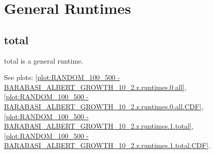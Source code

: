 %
%
\section{General Runtimes}

\subsection{total}
total is a general runtime.

See plots: \ref{plot:RANDOM_100_500 - BARABASI_ALBERT_GROWTH_10_2.z.runtimes.0.all}, \ref{plot:RANDOM_100_500 - BARABASI_ALBERT_GROWTH_10_2.z.runtimes.0.all.CDF}, \ref{plot:RANDOM_100_500 - BARABASI_ALBERT_GROWTH_10_2.z.runtimes.1.total}, \ref{plot:RANDOM_100_500 - BARABASI_ALBERT_GROWTH_10_2.z.runtimes.1.total.CDF}.

%
%

